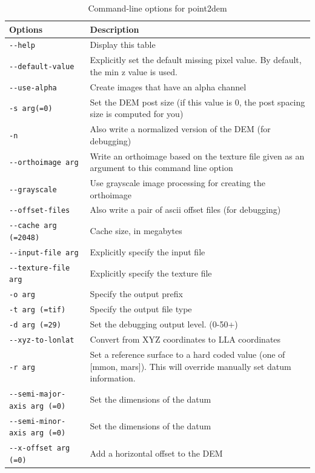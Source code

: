 \begin{longtable}{|l|p{10cm}|}
\caption{Command-line options for point2dem}
\label{tbl:point2dem}
\endfirsthead
\endhead
\endfoot
\endlastfoot
\hline
Options & Description \\ \hline \hline
\verb#--help# & Display this table \\ \hline
\verb#--default-value# & Explicitly set the default missing pixel value. By default, the min z value is used. \\ \hline
\verb#--use-alpha# & Create images that have an alpha channel \\ \hline
\verb#-s arg(=0)# & Set the DEM post size (if this value is 0, the post spacing size is computed for you) \\ \hline
\verb#-n# & Also write a normalized version of the DEM (for debugging) \\ \hline
\verb#--orthoimage arg# & Write an orthoimage based on the texture file given as an argument to this command line option \\ \hline
\verb#--grayscale# & Use grayscale image processing for creating the orthoimage \\ \hline
\verb#--offset-files# & Also write a pair of ascii offset files (for debugging) \\ \hline
\verb#--cache arg (=2048)# & Cache size, in megabytes \\ \hline
\verb#--input-file arg# & Explicitly specify the input file \\ \hline
\verb#--texture-file arg# & Explicitly specify the texture file \\ \hline
\verb#-o arg# & Specify the output prefix \\ \hline
\verb#-t arg (=tif)# & Specify the output file type \\ \hline
\verb#-d arg (=29)# & Set the debugging output level. (0-50+) \\ \hline
\verb#--xyz-to-lonlat# & Convert from XYZ coordinates to LLA coordinates \\ \hline
\verb#-r arg# & Set a reference surface to a hard coded value (one of [mmon, mars]). This will override manually set datum information. \\ \hline
\verb#--semi-major-axis arg (=0)# & Set the dimensions of the datum \\ \hline
\verb#--semi-minor-axis arg (=0)# & Set the dimensions of the datum \\ \hline
\verb#--x-offset arg (=0)# & Add a horizontal offset to the DEM \\ \hline

\end{longtable}
